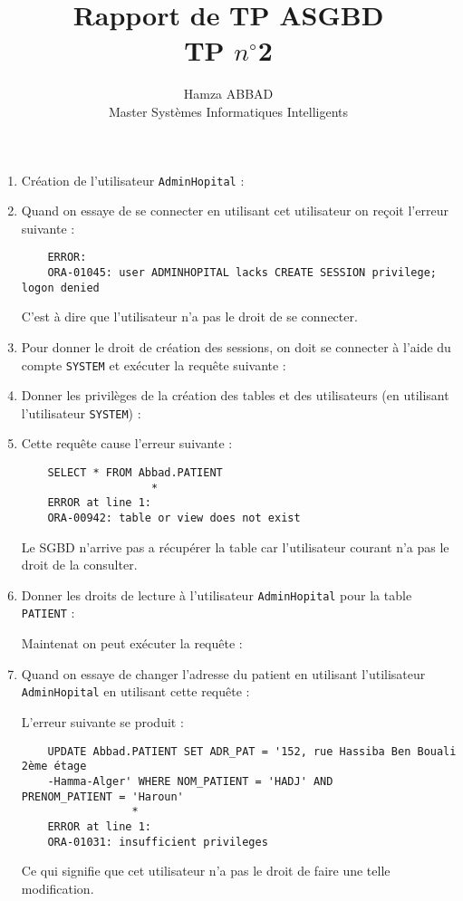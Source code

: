\documentclass[12pt,a4paper]{article}
\author{Hamza ABBAD\\ Master Systèmes Informatiques Intelligents}
\title{\textbf{Rapport de TP ASGBD} \\ TP $n^{\circ}$2}
\begin{document}
\maketitle
\begin{enumerate}
	\item Création de l'utilisateur \texttt{AdminHopital} :
	
	\item Quand on essaye de se connecter en utilisant cet utilisateur on reçoit l'erreur suivante :
	\begin{verbatim}
	ERROR:
	ORA-01045: user ADMINHOPITAL lacks CREATE SESSION privilege; logon denied
	\end{verbatim}
	C'est à dire que l'utilisateur n'a pas le droit de se connecter.
	\item Pour donner le droit de création des sessions, on doit se connecter à l'aide du compte \texttt{SYSTEM}
	et exécuter la requête suivante :
	
	\item Donner les privilèges de la création des tables et des utilisateurs (en utilisant l'utilisateur \texttt{SYSTEM}) :
	
	\item Cette requête cause l'erreur suivante :
	\begin{verbatim}
	SELECT * FROM Abbad.PATIENT
                    *
	ERROR at line 1:
	ORA-00942: table or view does not exist
	\end{verbatim}
	Le SGBD n'arrive pas a récupérer la table car l'utilisateur courant n'a pas le droit de la consulter.
	\item Donner les droits de lecture à l'utilisateur \texttt{AdminHopital} pour la table \texttt{PATIENT} :
	
	Maintenat on peut exécuter la requête :
	
	\item Quand on essaye de changer l'adresse du patient en utilisant l'utilisateur \texttt{AdminHopital}
	en utilisant cette requête :
	
	L'erreur suivante se produit :
	\begin{verbatim}
	UPDATE Abbad.PATIENT SET ADR_PAT = '152, rue Hassiba Ben Bouali 2ème étage 
	-Hamma-Alger' WHERE NOM_PATIENT = 'HADJ' AND 		PRENOM_PATIENT = 'Haroun'
    	         *
	ERROR at line 1:
	ORA-01031: insufficient privileges
	\end{verbatim}
	Ce qui signifie que cet utilisateur n'a pas le droit de faire une telle modification.
\end{enumerate}
\end{document}
